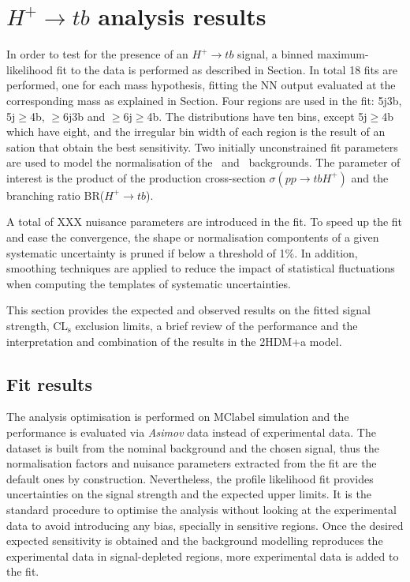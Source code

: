 \chapter{$H^+\to tb$ analysis results}
In order to test for the presence of an $H^+\to tb$ signal, a binned maximum-likelihood fit to the data is performed as described in Section. In total 18 fits are performed, one for each mass hypothesis, fitting the NN output evaluated at the corresponding mass as explained in Section. Four regions are used in the fit: 5j3b, 5j$\geq$4b, $\geq$6j3b and $\geq$6j$\geq$4b. The distributions have ten bins, except 5j$\geq$4b which have eight, and the irregular bin width of each region is the result of an sation that obtain the best sensitivity. Two initially unconstrained fit parameters are used to model the normalisation of the \ttb\ and \ttc\ backgrounds. The parameter of interest is the product of the production cross-section $\sigma(pp\to tbH^+)$ and the branching ratio BR($H^+\to tb$).

A total of XXX nuisance parameters are introduced in the fit. To speed up the fit and ease the convergence, the shape or normalisation compontents of a given systematic uncertainty is pruned if below a threshold of 1\%. In addition, smoothing techniques are applied to reduce the impact of statistical fluctuations when computing the templates of systematic uncertainties.

This section provides the expected and observed results on the fitted signal strength, CL$_{\text{s}}$ exclusion limits,  a brief review of the performance and the interpretation and combination of the results in the 2HDM+a model.

\section{Fit results}

The analysis optimisation is performed on \acrshort{MClabel} simulation and the performance is evaluated via \textit{Asimov} data instead of experimental data. The dataset is built from the nominal background and the chosen signal, thus the normalisation factors and nuisance parameters extracted from the fit are the default ones by construction. Nevertheless, the profile likelihood fit provides uncertainties on the signal strength and the expected upper limits. It is the standard procedure to optimise the analysis without looking at the experimental data to avoid introducing any bias, specially in sensitive regions. Once the desired expected sensitivity is obtained and the background modelling reproduces the experimental data in signal-depleted regions, more experimental data is added to the fit.

